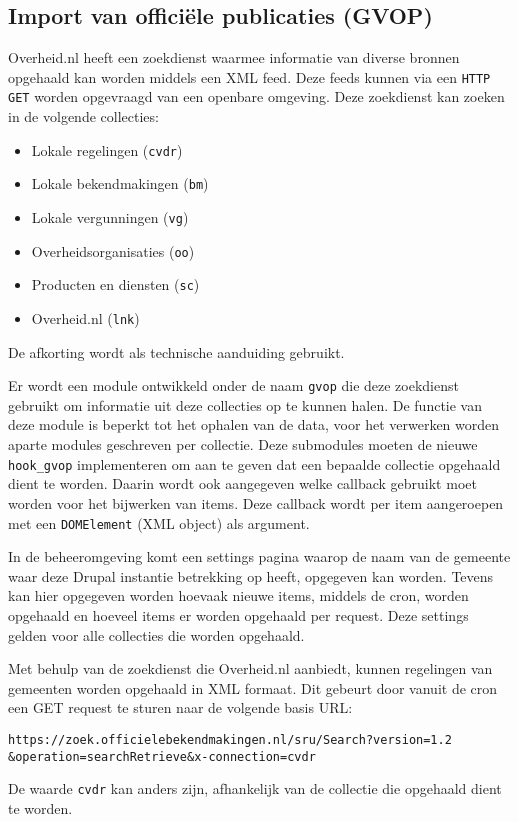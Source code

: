 \subsection{Import van offici\"{e}le publicaties (GVOP)}

Overheid.nl heeft een zoekdienst waarmee informatie van diverse bronnen opgehaald kan worden middels een XML feed. Deze feeds kunnen via een \texttt{HTTP GET} worden opgevraagd van een openbare omgeving. Deze zoekdienst kan zoeken in de volgende collecties:
\begin{itemize}
\item Lokale regelingen (\texttt{cvdr})
\item Lokale bekendmakingen (\texttt{bm})
\item Lokale vergunningen (\texttt{vg})
\item Overheidsorganisaties (\texttt{oo})
\item Producten en diensten (\texttt{sc})
\item Overheid.nl (\texttt{lnk})
\end{itemize}
De afkorting wordt als technische aanduiding gebruikt.

Er wordt een module ontwikkeld onder de naam \texttt{gvop} die deze zoekdienst gebruikt om informatie uit deze collecties op te kunnen halen. De functie van deze module is beperkt tot het ophalen van de data, voor het verwerken worden aparte modules geschreven per collectie. Deze submodules moeten de nieuwe \texttt{hook\_gvop} implementeren om aan te geven dat een bepaalde collectie opgehaald dient te worden. Daarin wordt ook aangegeven welke callback gebruikt moet worden voor het bijwerken van items. Deze callback wordt per item aangeroepen met een \texttt{DOMElement} (XML object) als argument.

In de beheeromgeving komt een settings pagina waarop de naam van de gemeente waar deze Drupal instantie betrekking op heeft, opgegeven kan worden. Tevens kan hier opgegeven worden hoevaak nieuwe items, middels de cron, worden opgehaald en hoeveel items er worden opgehaald per request. Deze settings gelden voor alle collecties die worden opgehaald.

Met behulp van de zoekdienst die Overheid.nl aanbiedt, kunnen regelingen van gemeenten worden opgehaald in XML formaat. Dit gebeurt door vanuit de cron een GET request te sturen naar de volgende basis URL:

\begin{verbatim}
https://zoek.officielebekendmakingen.nl/sru/Search?version=1.2
&operation=searchRetrieve&x-connection=cvdr
\end{verbatim}
De waarde \texttt{cvdr} kan anders zijn, afhankelijk van de collectie die opgehaald dient te worden.

